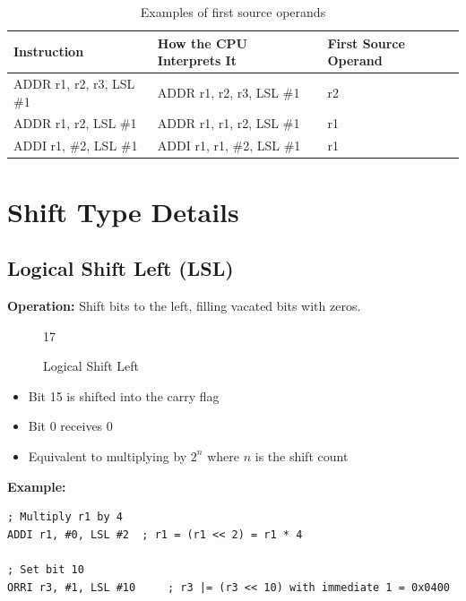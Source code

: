 \begin{table}[H]
	\centering
	\begin{tabular}{lll}
		\toprule
		\textbf{Instruction}     & \textbf{How the CPU Interprets It} & \textbf{First Source Operand} \\
		\midrule
		ADDR r1, r2, r3, LSL \#1 & ADDR r1, r2, r3, LSL \#1           & r2                            \\
		ADDR r1, r2, LSL \#1     & ADDR r1, r1, r2, LSL \#1           & r1                            \\
		ADDI r1, \#2, LSL \#1    & ADDI r1, r1, \#2, LSL \#1          & r1                            \\
		\bottomrule
	\end{tabular}
	\caption{Examples of first source operands}
	\label{tab:source-operand-examples}
\end{table}

\section{Shift Type Details}

\subsection{Logical Shift Left (LSL)}

\textbf{Operation:} Shift bits to the left, filling vacated bits with zeros.

\begin{figure}[H]
	\centering
	\begin{bytefield}[bitwidth=1.2em]{17}
		 \\
	\end{bytefield}
	\caption{Logical Shift Left}
\end{figure}

\begin{itemize}
	\item Bit 15 is shifted into the carry flag
	\item Bit 0 receives 0
	\item Equivalent to multiplying by $2^n$ where $n$ is the shift count
\end{itemize}

\textbf{Example:}
\begin{lstlisting}
; Multiply r1 by 4
ADDI r1, #0, LSL #2  ; r1 = (r1 << 2) = r1 * 4

; Set bit 10
ORRI r3, #1, LSL #10     ; r3 |= (r3 << 10) with immediate 1 = 0x0400
\end{lstlisting}

